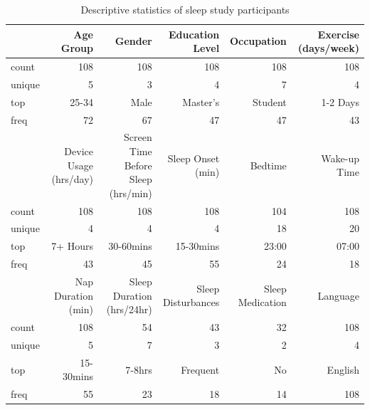 \documentclass[conference]{IEEEtran}
\begin{document}
\begin{table}
    \centering
    \caption{Descriptive statistics of sleep study participants}
    \label{tab:sleep_data2}
    \begin{tabular}{lrrrrr}
    \hline
    & Age Group & Gender & Education Level & Occupation & Exercise (days/week) \\ \hline
    count & 108 & 108 & 108 & 108 & 108 \\
    unique & 5 & 3 & 4 & 7 & 4 \\
    top & 25-34 & Male & Master's & Student & 1-2 Days \\
    freq & 72 & 67 & 47 & 47 & 43 \\ \hline
    & Device Usage (hrs/day) & Screen Time Before Sleep (hrs/min) & Sleep Onset (min) & Bedtime & Wake-up Time \\ \hline
    count & 108 & 108 & 108 & 104 & 108 \\
    unique & 4 & 4 & 4 & 18 & 20 \\
    top & 7+ Hours & 30-60mins & 15-30mins & 23:00 & 07:00 \\
    freq & 43 & 45 & 55 & 24 & 18 \\ \hline

    & Nap Duration (min) & Sleep Duration (hrs/24hr) & Sleep Disturbances & Sleep Medication & Language \\ \hline
    count & 108 & 54 & 43 & 32 & 108 \\
    unique & 5 & 7 & 3 & 2 & 4 \\
    top & 15-30mins & 7-8hrs & Frequent & No & English \\
    freq & 55 & 23 & 18 & 14 & 108 \\ \hline

    \end{tabular}
    \end{table}
    
\end{document}
